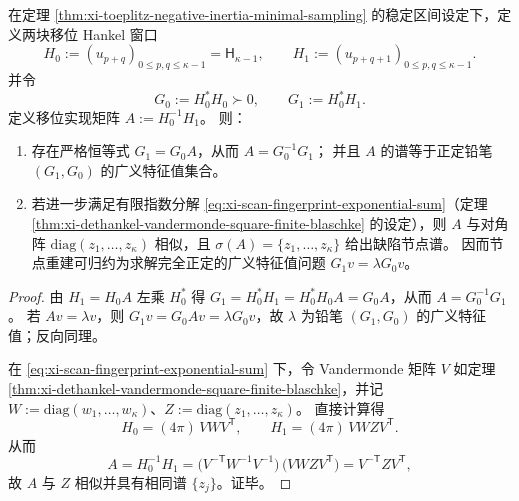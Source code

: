 \begin{theorem}\label{thm:xi-gram-shift-positive-pencil-node-spectrum}
在定理 \ref{thm:xi-toeplitz-negative-inertia-minimal-sampling} 的稳定区间设定下，定义两块移位 Hankel 窗口
\[
H_0:=(u_{p+q})_{0\le p,q\le \kappa-1}=\mathsf H_{\kappa-1},
\qquad
H_1:=(u_{p+q+1})_{0\le p,q\le \kappa-1}.
\]
并令
\[
G_0:=H_0^\ast H_0\succ0,\qquad G_1:=H_0^\ast H_1.
\]
定义移位实现矩阵 \(A:=H_0^{-1}H_1\)。
则：
\begin{enumerate}
  \item 存在严格恒等式 \(G_1=G_0A\)，从而 \(A=G_0^{-1}G_1\)；
  并且 \(A\) 的谱等于正定铅笔 \((G_1,G_0)\) 的广义特征值集合。
  \item 若进一步满足有限指数分解 \eqref{eq:xi-scan-fingerprint-exponential-sum}（定理 \ref{thm:xi-dethankel-vandermonde-square-finite-blaschke} 的设定），则 \(A\) 与对角阵 \(\mathrm{diag}(z_1,\dots,z_\kappa)\) 相似，且 \(\sigma(A)=\{z_1,\dots,z_\kappa\}\) 给出缺陷节点谱。
  因而节点重建可归约为求解完全正定的广义特征值问题 \(G_1v=\lambda G_0v\)。
\end{enumerate}
\end{theorem}
\begin{proof}
由 \(H_1=H_0A\) 左乘 \(H_0^\ast\) 得 \(G_1=H_0^\ast H_1=H_0^\ast H_0A=G_0A\)，从而 \(A=G_0^{-1}G_1\)。
若 \(Av=\lambda v\)，则 \(G_1v=G_0Av=\lambda G_0v\)，故 \(\lambda\) 为铅笔 \((G_1,G_0)\) 的广义特征值；反向同理。
\par
在 \eqref{eq:xi-scan-fingerprint-exponential-sum} 下，令 Vandermonde 矩阵 \(V\) 如定理 \ref{thm:xi-dethankel-vandermonde-square-finite-blaschke}，并记 \(W:=\mathrm{diag}(w_1,\dots,w_\kappa)\)、\(Z:=\mathrm{diag}(z_1,\dots,z_\kappa)\)。
直接计算得
\[
H_0=(4\pi)\,VWV^{\mathsf T},
\qquad
H_1=(4\pi)\,VWZV^{\mathsf T}.
\]
从而
\[
A=H_0^{-1}H_1
=\bigl(V^{-{\mathsf T}}W^{-1}V^{-1}\bigr)\,\bigl(VWZV^{\mathsf T}\bigr)
=V^{-{\mathsf T}}ZV^{\mathsf T},
\]
故 \(A\) 与 \(Z\) 相似并具有相同谱 \(\{z_j\}\)。证毕。
\end{proof}

